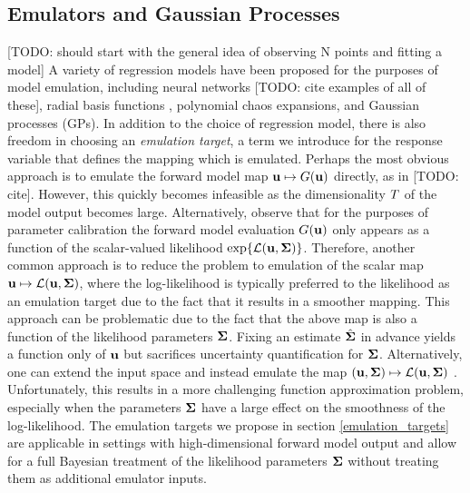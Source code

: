 \documentclass[12pt]{article}
\begin{document}
\subsection{Emulators and Gaussian Processes}
[TODO: should start with the general idea of observing N points and fitting a model]
A variety of regression models have been proposed for the purposes of model emulation, including neural networks [TODO: cite examples of all of these], 
radial basis functions \cite{doi:10.1198/106186008X320681}, polynomial chaos expansions, and Gaussian processes (GPs). In addition to the choice of regression model, there is also freedom in 
choosing an \textit{emulation target}, a term we introduce for the response variable that defines the mapping which is emulated. Perhaps the most obvious approach is 
to emulate the forward model map $\mathbf{u} \mapsto G(\mathbf{u})$ directly, as in [TODO: cite]. However, this quickly becomes infeasible as the dimensionality 
$T$ of the model output becomes large. Alternatively, observe that for the purposes of parameter calibration the forward model evaluation $G(\mathbf{u})$ 
only appears as a function of the scalar-valued likelihood $\exp\mathopen{}\left\{\mathcal{L}(\mathbf{u}, \boldsymbol{\Sigma})\right\}\mathclose{}$. Therefore, another common approach is to reduce the problem to 
emulation of the scalar map $\mathbf{u} \mapsto \mathcal{L}(\mathbf{u}, \boldsymbol{\Sigma})$, where the log-likelihood is typically preferred to the likelihood as an emulation target due to 
the fact that it results in a smoother mapping. This approach can be problematic due to the fact that the above map is also a function of the likelihood parameters 
$\boldsymbol{\Sigma}$. Fixing an estimate $\hat{\boldsymbol{\Sigma}}$ in advance yields a function only of $\mathbf{u}$ but sacrifices uncertainty quantification for $\boldsymbol{\Sigma}$. Alternatively, 
one can extend the input space and instead emulate the map $(\mathbf{u}, \boldsymbol{\Sigma}) \mapsto \mathcal{L}(\mathbf{u}, \boldsymbol{\Sigma})$ 
\cite{doi:10.1198/106186008X320681, LEBEL2019158}. Unfortunately, this results in a more challenging function approximation problem, especially when 
the parameters $\boldsymbol{\Sigma}$ have a large effect on the smoothness of the log-likelihood. The emulation targets we propose in section \ref{emulation_targets} are 
applicable in settings with high-dimensional forward model output and allow for a full Bayesian treatment of the likelihood parameters $\boldsymbol{\Sigma}$ without 
treating them as additional emulator inputs. 
\end{document}
